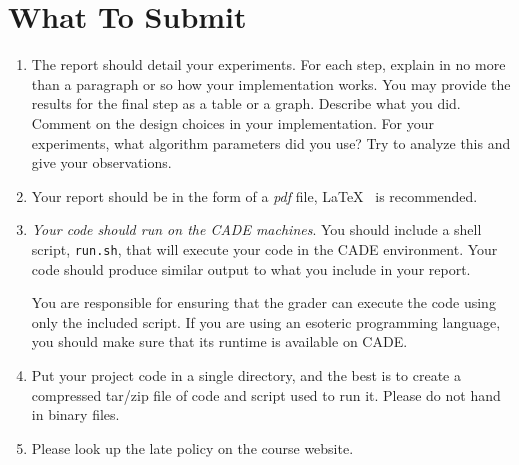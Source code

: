 \section*{What To Submit}

\begin{enumerate}
\item The report should detail your experiments. For each step,
  explain in no more than a paragraph or so how your implementation
  works. You may provide the results for the final step as a table or
  a graph. Describe what you did. Comment on the design choices in
  your implementation. For your experiments, what algorithm parameters
  did you use? Try to analyze this and give your observations.

\item Your report should be in the form of a \emph{pdf} file, \LaTeX
  ~is recommended.

\item {\em Your code should run on the CADE machines}. You should
  include a shell script, {\tt run.sh}, that will execute your code
  in the CADE environment. Your code should produce similar output
  to what you include in your report.
  
  You are responsible for ensuring that the grader can execute the
  code using only the included script. If you are using an esoteric
  programming language, you should make sure that its runtime is
  available on CADE.

\item Put your project code in a single directory, and the best is to
  create a compressed tar/zip file of code and script used to run it.
  Please do not hand in binary files.

\item Please look up the late policy on the course website.

\end{enumerate}

 
